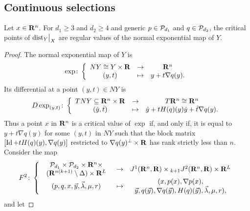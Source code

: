\subsection{Continuous selections}

\begin{proposition}
\label{D!P:exp-reg-alg}
  Let $x \in \mathbf{R}^n$. For $d_1 \geq 3$ and $d_2 \geq 4$ and generic $p\in \mathcal{P}_{d_1}$ and $q\in \mathcal{P}_{d_2}$, the critical points of $\mathord{\operatorname{dist}}_Y\big|_X$ are regular values of the normal exponential map of $Y$.
\end{proposition}

\begin{proof}
  The normal exponential map of $Y$ is
  \[
    \exp \colon \left\{ \begin{array}{ccc}
      NY \cong Y \times \mathbf{R} & \to & \mathbf{R}^n \\
      (y, t) & \mapsto & y + t \nabla q(y).
    \end{array} \right.
  \]
  Its differential at a point $(y, t) \in NY$ is
  \[
    D \exp_{(y, t)} \colon \left\{ \begin{array}{ccc}
      TNY \subseteq \mathbf{R}^n \times \mathbf{R} & \to & T \mathbf{R}^n \cong \mathbf{R}^n \\
      (\dot{y}, \dot{t}) & \mapsto & \dot{y} + t H(q)(y) \dot{y} + \dot{t} \nabla q(y).
    \end{array} \right.
  \]
  Thus a point $x$ in $\mathbf{R}^n$ is a critical value of $\exp$ if, and only if, it is equal to $y + t \nabla q(y)$ for some $(y, t)$ in $NY$ such that the block matrix $[\operatorname{Id} + t H(q)(y), \nabla q(y)]$ restricted to $\nabla q(y)^\bot \times \mathbf{R}$ has rank strictly less than $n$. Consider the map
  \[
    F^2 \colon \left\{ \begin{array}{ccc}
      \begin{array}{c}
        \mathcal{P}_{d_1} \times \mathcal{P}_{d_2} \times \mathbf{R}^n \times \\
        (\mathbf{R}^{n(k + 1)} \setminus \Delta) \times \mathbf{R}^L
      \end{array}
      & \to
      & J^1(\mathbf{R}^n, \mathbf{R}) \times {}_{k + 1} J^2(\mathbf{R}^n, \mathbf{R}) \times \mathbf{R}^L
    \\
      (p, q, x, \vec{y}, \vec{\lambda}, \mu, r)
      & \mapsto
      & \begin{array}{c}
        (x, p(x), \nabla p(x), \\
        \vec{y}, q(\vec{y}), \nabla q(\vec{y}), H(q)(\vec{y}), \vec{\lambda}, \mu, r),
      \end{array}
    \end{array} \right.
  \]
  and let

\end{proof}
